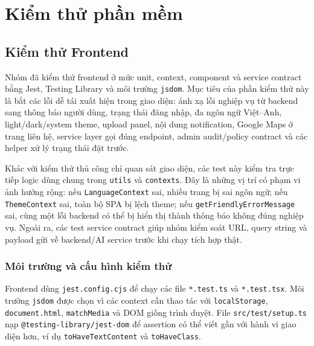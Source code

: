 \chapter{Kiểm thử phần mềm}

\section{Kiểm thử Frontend}

Nhóm đã kiểm thử frontend ở mức unit, context, component và service contract
bằng Jest, Testing Library và môi trường \texttt{jsdom}. Mục tiêu của phần kiểm
thử này là bắt các lỗi dễ tái xuất hiện trong giao diện: ánh xạ lỗi nghiệp vụ từ
backend sang thông báo người dùng, trạng thái đăng nhập, đa ngôn ngữ Việt--Anh,
light/dark/system theme, upload panel, nội dung notification, Google Maps ở
trang liên hệ, service layer gọi đúng endpoint, admin audit/policy contract và
các helper xử lý trạng thái đặt trước.

Khác với kiểm thử thủ công chỉ quan sát giao diện, các test này kiểm tra trực
tiếp logic dùng chung trong \texttt{utils} và \texttt{contexts}. Đây là những
vị trí có phạm vi ảnh hưởng rộng: nếu \texttt{LanguageContext} sai, nhiều trang
bị sai ngôn ngữ; nếu \texttt{ThemeContext} sai, toàn bộ SPA bị lệch theme; nếu
\texttt{getFriendlyErrorMessage} sai, cùng một lỗi backend có thể bị hiển thị
thành thông báo không đúng nghiệp vụ. Ngoài ra, các test service contract giúp
nhóm kiểm soát URL, query string và payload gửi về backend/AI service trước khi
chạy tích hợp thật.

\subsection{Môi trường và cấu hình kiểm thử}

Frontend dùng \texttt{jest.config.cjs} để chạy các file
\texttt{*.test.ts} và \texttt{*.test.tsx}. Môi trường \texttt{jsdom} được chọn
vì các context cần thao tác với \texttt{localStorage}, \texttt{document.html},
\texttt{matchMedia} và DOM giống trình duyệt. File \texttt{src/test/setup.ts}
nạp \texttt{@testing-library/jest-dom} để assertion có thể viết gần với hành vi
giao diện hơn, ví dụ \texttt{toHaveTextContent} và \texttt{toHaveClass}.

